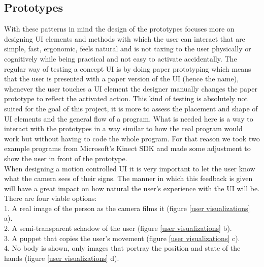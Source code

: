 \subsection{Prototypes}

With these patterns in mind the design of the prototypes focuses more on designing UI elements and methods with which the user can interact that are simple, fast, ergonomic, feels natural and is not taxing to the user physically or cognitively while being practical and not easy to activate accidentally. The regular way of testing a concept UI is by doing paper prototyping which means that the user is presented with a paper version of the UI (hence the name), whenever the user touches a UI element the designer manually changes the paper prototype to reflect the activated action. This kind of testing is absolutely not suited for the goal of this project, it is more to assess the placement and shape of UI elements and the general flow of a program. What is needed here is a way to interact with the prototypes in a way similar to how the real program would work but without having to code the whole program. For that reason we took two example programs from Microsoft's Kinect SDK and made some adjustment to show the user in front of the prototype.\\

When designing a motion controlled UI it is very important to let the user know what the camera sees of their signs. The manner in which this feedback is given will have a great impact on how natural the user's experience with the UI will be. There are four viable options:\\

 1. A real image of the person as the camera films it (figure \ref{user visualizations} a).\\
 2. A semi-transparent schadow of the user (figure \ref{user visualizations} b).\\
 3. A puppet that copies the user's movement (figure \ref{user visualizations} c).\\
 4. No body is shown, only images that portray the position and state of the hands (figure \ref{user visualizations} d).\\
 
